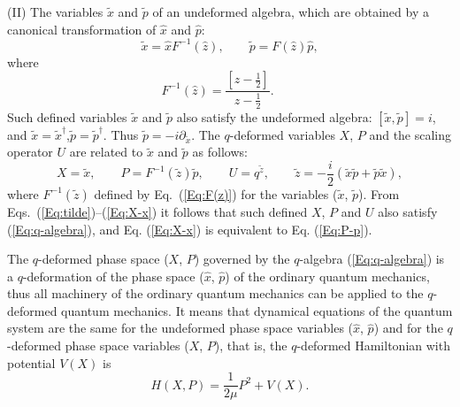 \documentclass[a4paper,12pt]{article}
\newcommand{\half}{{\textstyle\frac{1}{2}}}
\begin{document}
(II) The variables $\tilde x$ and $\tilde p$ of an undeformed algebra, 
which are obtained by a canonical transformation 
of $\hat x$ and $\hat p$:
\begin{equation}
\label{Eq:tilde}
\tilde x=\hat x F^{-1}(\hat z), \qquad \tilde p= F(\hat z)\hat p,
\end{equation}
where 
\begin{equation}
\label{Eq:F(z)}
F^{-1}(\hat z)= \frac{[\hat z-\half]}{\hat z-\half}. \qquad
\end{equation}
Such defined variables $\tilde x$ and $\tilde p$ also satisfy the undeformed 
algebra: $[ \tilde x, \tilde p ]=i$, and 
$\tilde x=\tilde x^{\dagger}$,\quad$\tilde p=\tilde p^{ \dagger}$.
Thus $\tilde p=-i\partial_{\tilde x}$.
The $q$-deformed variables $X$, $P$ and 
the scaling operator $U$ are related to  $\tilde  x$ and $\tilde p$ as follows:
\begin{equation}
\label{Eq:X-x}
X=\tilde x, \qquad P=F^{-1}(\tilde z) \tilde p, \qquad
U= q^{\tilde z}, \qquad  \tilde z=-\frac{i}{2}(\tilde x\tilde p + 
\tilde p\tilde x),
\end{equation}
where $F^{-1}(\tilde z)$ defined by Eq.~(\ref{Eq:F(z)}) for the variables  
($\tilde  x$, $\tilde p$).
From Eqs.~(\ref{Eq:tilde})--(\ref{Eq:X-x}) it follows that such defined $X$,
$P$ and $U$ also satisfy (\ref{Eq:q-algebra}), and Eq. (\ref{Eq:X-x})  is 
equivalent to Eq. (\ref{Eq:P-p}).

The $q$-deformed phase space ($X$, $P$) governed by the $q$-algebra 
(\ref{Eq:q-algebra}) is a $q$-deformation of the phase space 
($\hat x$, $\hat p$) of the ordinary quantum mechanics,
 thus all machinery of  the ordinary quantum mechanics can be applied to
 the $q$-deformed quantum mechanics. 
It means that dynamical equations of the quantum system are the same 
for the undeformed phase space variables ($\hat x$, $\hat p$) and 
for the $q$-deformed  phase space variables ($X$, $P$),
that is,  the $q$-deformed Hamiltonian with potential $V(X)$ is
\begin{equation}
\label{Eq:q-hamiltonian}
H(X,P)=\frac{1}{2\mu}P^{2}+V(X).
\end{equation}
\end{document}

